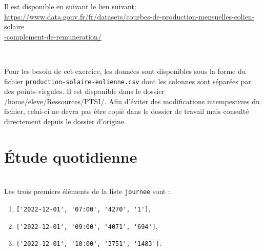 Il est disponible en suivant le lien suivant:\\
\href{https://www.data.gouv.fr/fr/datasets/courbes-de-production-mensuelles-eolien-solaire-complement-de-remuneration/}{https://www.data.gouv.fr/fr/datasets/courbes-de-production-mensuelles-eolien-solaire\\-complement-de-remuneration/}

~\

Pour les besoin de cet exercice, les données sont disponibles sous la forme du fichier \verb?production-solaire-eolienne.csv? dont les colonnes sont séparées par des points-virgules. Il est disponible dans le dossier \og/home/eleve/Ressources/PTSI/\fg. Afin d'éviter des modifications intempestives du fichier, celui-ci ne devra pas être copié dans le dossier de travail mais consulté directement depuis le dossier d'origine.

\section{Étude quotidienne}




~\ \\

Les trois premiers éléments de la liste \verb?journee? sont :
\begin{enumerate}
\item \verb?['2022-12-01', '07:00', '4270', '1']?,
\item \verb?['2022-12-01', '09:00', '4071', '694']?,
\item \verb?['2022-12-01', '10:00', '3751', '1483']?.
\end{enumerate}

